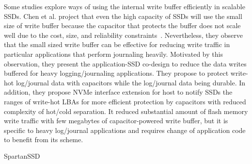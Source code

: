 Some studies explore ways of using the internal write buffer efficiently in
scalable SSDs. Chen et al. project that even the high capacity of SSDs will use
the small size of write buffer because the capacitor that protects the buffer
does not scale well due to the cost, size, and reliability
constraints~\cite{ChenLZ19tc}. Nevertheless, they observe that the small sized
write buffer can be effective for reducing write traffic in particular
applications that perform journaling heavily. Motivated by this observation,
they present the application-SSD co-design to reduce the data writes buffered
for heavy logging/journaling applications. They propose to protect write-hot
log/journal data with capacitors while the log/journal data being durable.  In
addition, they propose NVMe interface extension for host to notify SSDs the
ranges of write-hot LBAs for more efficient protection by capacitors with
reduced complexity of hot/cold separation.  It reduced substantial amount of
flash memory write traffic with few megabytes of capacitor-powered write
buffer, but it is specific to heavy log/journal applications and requires
change of application code to benefit from its scheme.

SpartanSSD~\cite{lee2021spartanssd}
